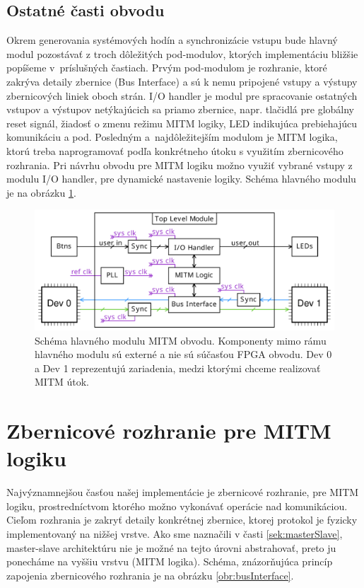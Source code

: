 \subsection{Ostatné časti obvodu}
Okrem generovania systémových hodín a synchronizácie vstupu bude hlavný modul pozostávať z troch dôležitých pod-modulov, ktorých implementáciu bližšie popíšeme v~príslušných častiach. Prvým pod-modulom je rozhranie, ktoré zakrýva detaily zbernice (Bus Interface) a sú k nemu pripojené vstupy a výstupy zbernicových liniek oboch strán. I/O handler je modul pre spracovanie ostatných vstupov a výstupov netýkajúcich sa priamo zbernice, napr. tlačidlá pre globálny reset signál, žiadosť o zmenu režimu MITM logiky, LED indikujúca prebiehajúcu komunikáciu a pod. Posledným a~najdôležitejším modulom je MITM logika, ktorú treba naprogramovať podľa konkrétneho útoku s využitím zbernicového rozhrania. Pri návrhu obvodu pre MITM logiku možno využiť vybrané vstupy z modulu I/O handler, pre dynamické nastavenie logiky. Schéma hlavného modulu je na obrázku \ref{obr:topLevelModule}.

\begin{figure}
    \centerline{\includegraphics[width=1\textwidth]{images/designs/topLevelModule.pdf}}
    \caption[Schéma hlavného modulu MITM obvodu]{Schéma hlavného modulu MITM obvodu. Komponenty mimo rámu hlavného modulu sú externé a nie sú súčasťou FPGA obvodu. Dev 0 a Dev 1 reprezentujú zariadenia, medzi ktorými chceme realizovať MITM útok.}
    \label{obr:topLevelModule}
\end{figure}

\section{Zbernicové rozhranie pre MITM logiku} \label{sek:busInterface}
Najvýznamnejšou časťou našej implementácie je zbernicové rozhranie, pre MITM logiku, prostredníctvom ktorého možno vykonávať operácie nad komunikáciou. Cieľom rozhrania je zakryť detaily konkrétnej zbernice, ktorej protokol je fyzicky implementovaný na nižšej vrstve. Ako sme naznačili v časti \ref{sek:masterSlave}, master-slave architektúru nie je možné na tejto úrovni abstrahovať, preto ju ponecháme na vyššiu vrstvu (MITM logika). Schéma, znázorňujúca princíp zapojenia zbernicového rozhrania je na obrázku \ref{obr:busInterface}.

